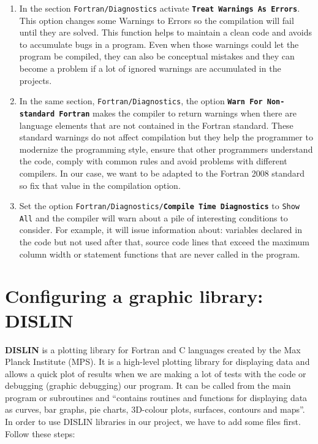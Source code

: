 \begin{enumerate}
    \item In the section \texttt{Fortran/Diagnostics} activate \textbf{\texttt{Treat Warnings As Errors}}. This option changes some Warnings to Errors so the compilation will fail until they are solved. This function helps to maintain a clean code and avoids to accumulate bugs in a program. Even when those warnings could let the program be compiled, they can also be conceptual mistakes and they can become a problem if a lot of ignored warnings are accumulated in the projects.
    
    \item In the same section, \texttt{Fortran/Diagnostics}, the option \textbf{\texttt{Warn For Non-standard Fortran}} makes the compiler to return warnings when there are language elements that are not contained in the Fortran standard. These standard warnings do not affect compilation but they help the programmer to modernize the programming style, ensure that other programmers understand the code, comply with common rules and avoid problems with different compilers. In our case, we want to be adapted to the Fortran 2008 standard so fix that value in the compilation option.
    
    \item Set the option \texttt{Fortran/Diagnostics/\textbf{Compile Time Diagnostics}} to \texttt{Show All} and the compiler will warn about a pile of interesting conditions to consider. For example, it will issue information about: variables declared in the code but not used after that, source code lines that exceed the maximum column width or statement functions that are never called in the program. 

\end{enumerate}




\newpage
\FloatBarrier
    \section{Configuring a graphic library: DISLIN}
    
\textbf{DISLIN} is a plotting library for Fortran and C languages created by the Max Planck Institute (MPS). It is a high-level plotting library for displaying data and allows a quick plot of results when we are making a lot of tests with the code or debugging (graphic debugging) our program. It can be called from the main program or subroutines and ``contains routines and functions for displaying data as curves, bar graphs, pie charts, 3D-colour plots, surfaces, contours and maps''. In order to use DISLIN libraries in our project, we have to add some files first. Follow these steps: 

